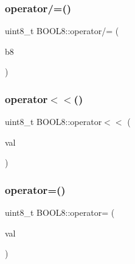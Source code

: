 \hypertarget{struct_b_o_o_l8_a0a8baa1ccf80887c5fc90002b3412878}{}\label{struct_b_o_o_l8_a0a8baa1ccf80887c5fc90002b3412878} 
\subsubsection{\texorpdfstring{operator/=()}{operator/=()}\hspace{0.1cm}{\footnotesize\ttfamily [2/2]}}
{\footnotesize\ttfamily uint8\+\_\+t B\+O\+O\+L8\+::operator/= (\begin{DoxyParamCaption}\item[{const \hyperlink{struct_b_o_o_l8}{B\+O\+O\+L8}}]{b8 }\end{DoxyParamCaption})\hspace{0.3cm}{\ttfamily [inline]}}

\hypertarget{struct_b_o_o_l8_aabd1a1ca848cb396417deeaa7a3007f1}{}\label{struct_b_o_o_l8_aabd1a1ca848cb396417deeaa7a3007f1} 
\subsubsection{\texorpdfstring{operator$<$$<$()}{operator<<()}}
{\footnotesize\ttfamily uint8\+\_\+t B\+O\+O\+L8\+::operator$<$$<$ (\begin{DoxyParamCaption}\item[{const uint8\+\_\+t}]{val }\end{DoxyParamCaption})\hspace{0.3cm}{\ttfamily [inline]}}

\hypertarget{struct_b_o_o_l8_a7b521b048b49883d0817a6abf2093f56}{}\label{struct_b_o_o_l8_a7b521b048b49883d0817a6abf2093f56} 
\subsubsection{\texorpdfstring{operator=()}{operator=()}}
{\footnotesize\ttfamily uint8\+\_\+t B\+O\+O\+L8\+::operator= (\begin{DoxyParamCaption}\item[{const uint8\+\_\+t}]{val }\end{DoxyParamCaption})\hspace{0.3cm}{\ttfamily [inline]}}


